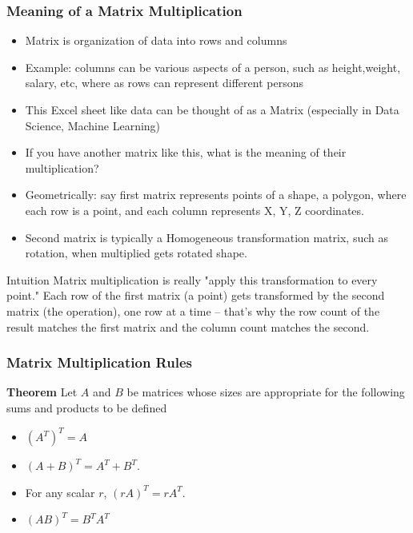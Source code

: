 \begin{frame}[fragile]\frametitle{Meaning of a Matrix Multiplication}

 \begin{itemize}
  \item Matrix is organization of data into rows and columns
  \item Example: columns can be various aspects of a person, such as height,weight, salary, etc, where as rows can represent different persons 
  \item This Excel sheet like data can be thought of as a Matrix (especially in Data Science, Machine Learning)
  \item If you have another matrix like this, what is the meaning of their multiplication?
  \item Geometrically: say first matrix represents points of a shape, a polygon, where each row is a point, and each column represents X, Y, Z coordinates.
  \item Second matrix is typically a Homogeneous transformation matrix, such as rotation,  when multiplied gets rotated shape.
 \end{itemize}

\begin{block}{Intuition}
Matrix multiplication is really "apply this transformation to every point." Each row of the first matrix (a point) gets transformed by the second matrix (the operation), one row at a time -- that's why the row count of the result matches the first matrix and the column count matches the second.
\end{block}

\end{frame}

\begin{frame}[fragile]\frametitle{Matrix Multiplication Rules}
\textbf{Theorem}  Let $A$ and $B$ be matrices whose sizes are appropriate for the following 
sums and products to be defined
 \begin{itemize}
  \item $(A^T)^T = A$
\item $(A+B)^T = A^T + B^T$.
\item For any scalar $r$, $(rA)^T=rA^T$.
\item $(AB)^T = B^T A^T$
 \end{itemize}


\end{frame}


